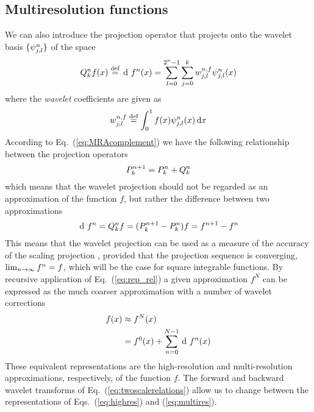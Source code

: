 \subsection{Multiresolution functions}
We can also introduce the projection operator  that projects
onto the wavelet basis $\lbrace\psi^n_{j,l}\rbrace$ of the space 
\begin{equation}
    \label{eq:wavelet_exp}
    \waveletproj{n}f(x) \mydef \waveletrep{f}{n}(x) =
    \sum_{l=0}^{2^n-1}\sum_{j=0}^k\waveletcoef^{n,f}_{j,l}\wavelet^n_{j,l}(x)
\end{equation}
where the \emph{wavelet} coefficients are given as
\begin{equation}
    \label{eq:wavelet_coef}
    w^{n,f}_{j,l} \stackrel{\text{def}}{\hbox{=}} \int_0^1f(x)\psi^n_{j,l}(x)\,\mathrm{d} x
\end{equation}
According to Eq.~(\ref{eq:MRAcomplement}) we have the following relationship 
between the projection operators
\begin{equation}
    \label{eq:proj_rel}
    {P}_{k}^{n+1} = {P}_{k}^{n} + {Q}_{k}^{n}
\end{equation}
which means that the wavelet projection should not be regarded as an approximation 
of the function $f$, but rather the difference between two approximations
\begin{equation}
    \label{eq:rep_rel}
    \waveletrep{f}{n} = \waveletproj{n} f = (\scalingproj{n+1}-\scalingproj{n})f = 
	\scalingrep{f}{n+1} - \scalingrep{f}{n}
\end{equation}
This means that the wavelet projection  can be used as a measure 
of the accuracy of the scaling projection , provided that the 
projection sequence is converging, $\lim_{n\rightarrow\infty} {f}^{n} = f$, 
which will be the case for square integrable functions\cite{Alpert:1993p5460}.
By recursive application of Eq.~(\ref{eq:rep_rel}) a given approximation $f^N$ can 
be expressed as the much coarser approximation  with a number 
of wavelet corrections
\begin{align}
    \label{eq:highres}
    f(x)    &\approx \scalingrep{f}{N}(x)\\
    \label{eq:multires}
	    &= \scalingrep{f}{0}(x) + \sum_{n=0}^{N-1} \waveletrep{f}{n}(x)
\end{align}
These equivalent representations are the high-resolution and multi-resolution 
approximations, respectively, of the function $f$. The forward and backward
wavelet transforms of Eq.~(\ref{eq:twoscalerelations}) allow us to change between 
the representations of Eqs.~(\ref{eq:highres}) and (\ref{eq:multires}).

